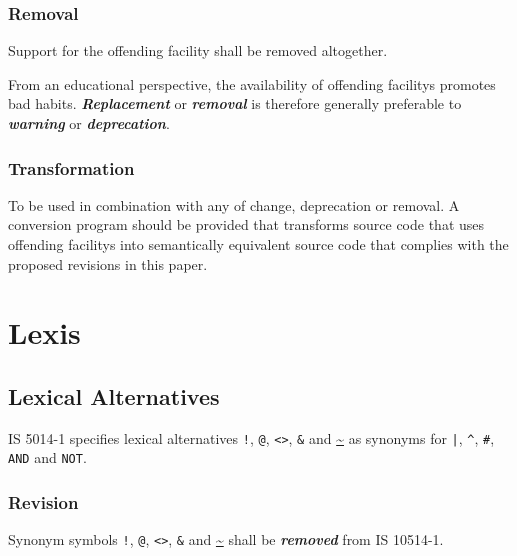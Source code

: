\documentclass[10pt,a4paper,leqno,fleqn]{article}
\renewcommand{\emph}[1]{\textbf{\textit{#1}}}
\begin{document}
\subsubsection{Removal}

Support for the \gls{offending facility} shall be removed altogether.\\

\par\noindent From an educational perspective, the availability of
\glspl{offending facility} promotes bad habits. \emph{Replacement} or
\emph{removal} is therefore generally preferable to \emph{warning} or
\emph{deprecation}.

\subsubsection{Transformation}

To be used in combination with any of change, deprecation or removal.
A conversion program should be provided that transforms source code that uses
\glspl{offending facility} into semantically equivalent source code that
complies with the proposed revisions in this paper.



\section{Lexis}

\subsection{Lexical Alternatives}

IS 5014-1 specifies lexical alternatives \verb|!|, \verb|@|, \verb|<>|, \verb|&| and
\url{~} as synonyms for \verb!|!, \verb|^|, \verb|#|, \verb|AND| and \verb|NOT|.

\subsubsection{Revision}

Synonym symbols \verb|!|, \verb|@|, \verb|<>|, \verb|&| and \url{~} shall be
\emph{removed} from IS 10514-1.
\end{document}
